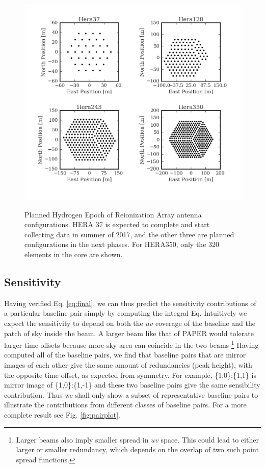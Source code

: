 \documentclass[twocolumn,apj,numberedappendix]{emulateapj}
\renewcommand\[{\begin{equation}}
\renewcommand\]{\end{equation}}
\begin{document}
\begin{figure}[h]
\includegraphics[width=\linewidth]{HeraAntpos}
\label{fig:HeraAntpos}
\caption{Planned Hydrogen Epoch of Reionization Array antenna configurations. HERA 37 is expected to complete and start collecting data in summer of 2017, and the other three are planned configurations in the next phases. For HERA350, only the 320 elements in the core are shown. }
\end{figure}

\subsection{ Sensitivity \label{sec:sensitivity}}

Having verified Eq. \eqref{eq:final}, we can thus predict the sensitivity contributions of a
particular baseline pair simply by computing the integral Eq. \.
Intuitively we expect the sensitivity to depend on both the $uv$ coverage of the baseline and the patch of sky inside the beam. A larger beam like that of PAPER would tolerate larger time-offsets because more sky area can coincide in the two beams \footnote{Larger beams also imply smaller spread in $uv$ space. This could lead to either larger or smaller redundancy, which depends on the overlap of two such point spread functions.}
Having computed all of the baseline pairs, we find that baseline pairs that are mirror images of each other 
give the same amount of redundancies (peak height), with the opposite time offset, as expected from symmetry. 
For example, \{1,0\}:\{1,1\} is mirror image of \{1,0\}:\{1,-1\} and these two baseline pairs
give the same sensibility contribution. Thus we shall only show a subset of representative baseline pairs to illustrate the contributions from different classes of baseline pairs. For a more complete result see Fig. \ref{fig:pairplot}.  
\end{document}
